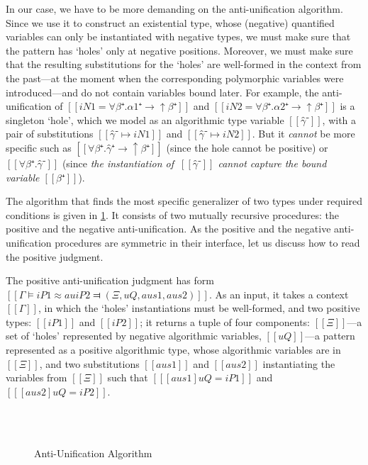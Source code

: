 In our case, we have to be more demanding on the anti-unification algorithm.
Since we use it to construct an existential type, whose (negative) quantified
variables can only be instantiated with negative types, we must make sure that
the pattern has `holes' only at negative positions. Moreover, we must make sure
that the resulting substitutions for the `holes' are well-formed in the context
from the past---at the moment when the corresponding polymorphic variables were
introduced---and do not contain variables bound later. For example, the
anti-unification of $[[iN1 = ∀β⁺.α1⁺ → ↑β⁺]]$ and $[[iN2 = ∀β⁺.α2⁺ → ↑β⁺]]$ is a
singleton `hole', which we model as an algorithmic type variable $[[γ̂⁻]]$, with
a pair of substitutions $[[γ̂⁻ ↦ iN1]]$ and $[[γ̂⁻ ↦ iN2]]$. But it
\emph{cannot} be more specific such as $[[∀β⁺.γ̂⁺ → ↑β⁺]]$ (since the hole
cannot be positive) or $[[∀β⁺.γ̂⁻]]$ (since \emph{the instantiation of $~[[γ̂⁻]]$ cannot capture the
bound variable $[[β⁺]]$}).

The algorithm that finds the most specific generalizer of two types
under required conditions is given in \cref{fig:anti-unification}.
It consists of two mutually recursive procedures:
the positive and the negative anti-unification. 
As the positive and the negative anti-unification procedures
are symmetric in their interface, let us discuss how to read
the positive judgment. 

The positive anti-unification judgment has form
$[[Γ ⊨ iP1 ≈au iP2 ⫤ ( Ξ , uQ , aus1 , aus2 )]]$.
As an input, it takes a context $[[Γ]]$, in which the `holes'
instantiations must be well-formed, 
and two positive types: $[[iP1]]$ and $[[iP2]]$;
it returns a tuple of four components:
$[[Ξ]]$---a set of `holes' represented by negative algorithmic variables,
$[[uQ]]$---a pattern represented as a positive algorithmic type,
whose algorithmic variables are in $[[Ξ]]$,
and two substitutions $[[aus1]]$ and $[[aus2]]$
instantiating the variables from $[[Ξ]]$ such that
$[[ [aus1]uQ = iP1 ]]$ and $[[ [aus2]uQ = iP2 ]]$. 

\begin{figure}[t]
    \ottdefnAUAUPLabeled{}
    \hfill\\
    \hfill\\
    \ottdefnAUAUNLabeled{}
    \caption{Anti-Unification Algorithm}
    \label{fig:anti-unification}
\end{figure}

